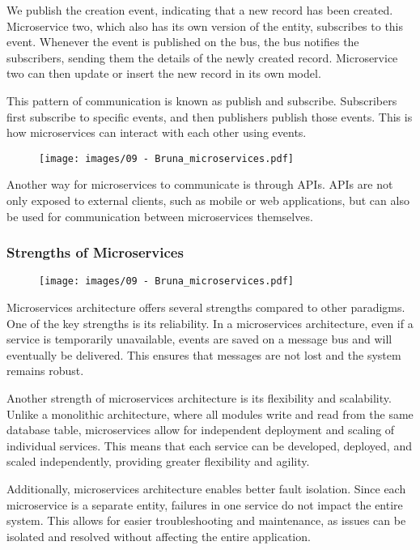 We publish the creation event, indicating that a new record has been
created. Microservice two, which also has its own version of the entity,
subscribes to this event. Whenever the event is published on the bus,
the bus notifies the subscribers, sending them the details of the newly
created record. Microservice two can then update or insert the new
record in its own model.

This pattern of communication is known as publish and subscribe.
Subscribers first subscribe to specific events, and then publishers
publish those events. This is how microservices can interact with each
other using events.

\begin{figure}[!h]
  \centering
  \texttt{[image: images/09 - Bruna\_microservices.pdf]}
\end{figure}

Another way for microservices to communicate is through APIs. APIs are
not only exposed to external clients, such as mobile or web
applications, but can also be used for communication between
microservices themselves.

\subsubsection{Strengths of Microservices}

\begin{figure}[!h]
  \centering
  \texttt{[image: images/09 - Bruna\_microservices.pdf]}
\end{figure}

Microservices architecture offers several strengths compared to other
paradigms. One of the key strengths is its reliability. In a
microservices architecture, even if a service is temporarily
unavailable, events are saved on a message bus and will eventually be
delivered. This ensures that messages are not lost and the system
remains robust.

Another strength of microservices architecture is its flexibility and
scalability. Unlike a monolithic architecture, where all modules write
and read from the same database table, microservices allow for
independent deployment and scaling of individual services. This means
that each service can be developed, deployed, and scaled independently,
providing greater flexibility and agility.

Additionally, microservices architecture enables better fault isolation.
Since each microservice is a separate entity, failures in one service do
not impact the entire system. This allows for easier troubleshooting and
maintenance, as issues can be isolated and resolved without affecting
the entire application.

